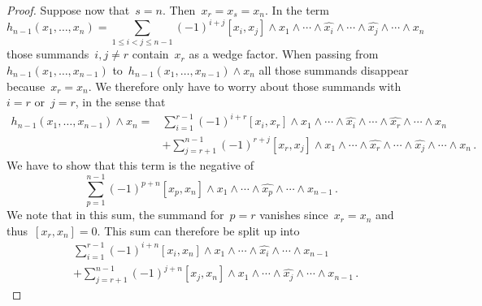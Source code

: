 \begin{proof}
	Suppose now that~$s = n$.
	Then~$x_r = x_s = x_n$.
	In the term
	\[
		h_{n-1}(x_1, \dotsc, x_n)
		=
		\sum_{1 \leq i < j \leq n-1}
		(-1)^{i+j}
		[x_i, x_j] \wedge x_1 \wedge \dotsb \wedge \widehat{x_i} \wedge \dotsb \wedge \widehat{x_j} \wedge \dotsb \wedge x_n
	\]
	those summands~$i, j \neq r$ contain~$x_r$ as a wedge factor.
	When passing from~$h_{n-1}(x_1, \dotsc, x_{n-1})$ to~$h_{n-1}(x_1, \dotsc, x_{n-1}) \wedge x_n$ all those summands disappear because~$x_r = x_n$.
	We therefore only have to worry about those summands with~$i = r$ or~$j = r$, in the sense that
	\begin{equation}
		\label{first term as sum of two sums}
		\begin{aligned}
			h_{n-1}(x_1, \dotsc, x_{n-1}) \wedge x_n
			={}&
			\sum_{i=1}^{r-1}
			(-1)^{i+r}
			[x_i, x_r] \wedge x_1 \wedge \dotsb \wedge \widehat{x_i} \wedge \dotsb \wedge \widehat{x_r} \wedge \dotsb \wedge x_n
			\\
			{}&
			+
			\sum_{j=r+1}^{n-1}
			(-1)^{r+j}
			[x_r, x_j] \wedge x_1 \wedge \dotsb \wedge \widehat{x_r} \wedge \dotsb \wedge \widehat{x_j} \wedge \dotsb \wedge x_n \,.
		\end{aligned}
	\end{equation}
	We have to show that this term is the negative of
	\[
		\sum_{p=1}^{n-1}
		(-1)^{p+n}
		[x_p, x_n] \wedge x_1 \wedge \dotsb \wedge \widehat{x_p} \wedge \dotsb \wedge x_{n-1} \,.
	\]
	We note that in this sum, the summand for~$p = r$ vanishes since~$x_r = x_n$ and thus~$[x_r, x_n] = 0$.
	This sum can therefore be split up into
	\begin{equation}
		\label{second term as sum of two sums}
		\begin{aligned}
			{}&
			\sum_{i=1}^{r-1}
			(-1)^{i+n}
			[x_i, x_n] \wedge x_1 \wedge \dotsb \wedge \widehat{x_i} \wedge \dotsb \wedge x_{n-1}
			\\
			{}&
			+
			\sum_{j=r+1}^{n-1}
			(-1)^{j+n}
			[x_j, x_n] \wedge x_1 \wedge \dotsb \wedge \widehat{x_j} \wedge \dotsb \wedge x_{n-1} \,.
		\end{aligned}
	\end{equation}


\end{proof}
